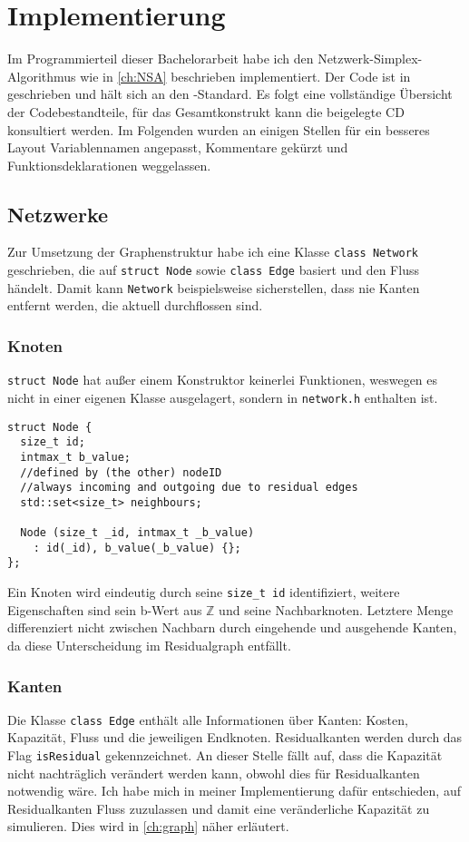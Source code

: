 \chapter{Implementierung} \label{ch:prog}
Im Programmierteil dieser Bachelorarbeit habe ich den Netzwerk-Simplex-Algorithmus wie in \cref{ch:NSA} beschrieben implementiert. Der Code ist in \cpp geschrieben und hält sich an den \cppelf-Standard. Es folgt eine vollständige Übersicht der Codebestandteile, für das Gesamtkonstrukt kann die beigelegte CD konsultiert werden. Im Folgenden wurden an einigen Stellen für ein besseres Layout Variablennamen angepasst, Kommentare gekürzt und Funktionsdeklarationen weggelassen.

\section{Netzwerke}
Zur Umsetzung der Graphenstruktur habe ich eine Klasse \lstinline|class Network| geschrieben, die auf \lstinline|struct Node| sowie \lstinline|class Edge| basiert und den Fluss händelt. Damit kann \lstinline|Network| beispielsweise sicherstellen, dass nie Kanten entfernt werden, die aktuell durchflossen sind.

\subsection{Knoten}
\lstinline|struct Node| hat außer einem Konstruktor keinerlei Funktionen, weswegen es nicht in einer eigenen Klasse ausgelagert, sondern in \lstinline|network.h| enthalten ist. 

\begin{lstlisting}
struct Node {
  size_t id;
  intmax_t b_value;
  //defined by (the other) nodeID
  //always incoming and outgoing due to residual edges
  std::set<size_t> neighbours;

  Node (size_t _id, intmax_t _b_value)
    : id(_id), b_value(_b_value) {};
};
\end{lstlisting}

Ein Knoten wird eindeutig durch seine \lstinline|size_t id| identifiziert, weitere Eigenschaften sind sein b-Wert aus $\mathbb{Z}$ und seine Nachbarknoten. Letztere Menge differenziert nicht zwischen Nachbarn durch eingehende und ausgehende Kanten, da diese Unterscheidung im Residualgraph entfällt.

\subsection{Kanten}
Die Klasse \lstinline|class Edge| enthält alle Informationen über Kanten: Kosten, Kapazität, Fluss und die jeweiligen Endknoten. Residualkanten werden durch das Flag \lstinline|isResidual| gekennzeichnet. An dieser Stelle fällt auf, dass die Kapazität nicht nachträglich verändert werden kann, obwohl dies für Residualkanten notwendig wäre. Ich habe mich in meiner Implementierung dafür entschieden, auf Residualkanten Fluss zuzulassen und damit eine veränderliche Kapazität zu simulieren. Dies wird in \cref{ch:graph} näher erläutert.

